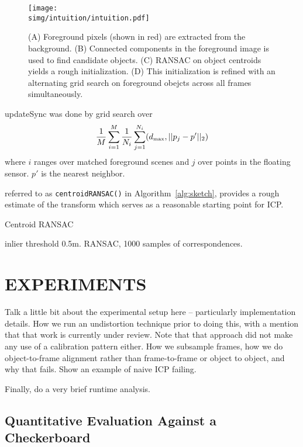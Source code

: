 \documentclass[letterpaper, 10 pt, conference]{ieeeconf}  %
\newcommand{\simg}{static_img}
\begin{document}
\begin{figure*}
  \centering
  \texttt{[image: \\simg/intuition/intuition.pdf]}
  \caption{(A) Foreground pixels (shown in red) are extracted from the background. (B) Connected components in the foreground image is used to find candidate objects. (C) RANSAC on object centroids yields a rough initialization. (D) This initialization is refined with an alternating grid search on foreground obejcts across all frames simultaneously. }
  \label{fig:}
\end{figure*}


updateSync was done by grid search over
\newcommand{\dmax}{d_{\mbox{\tiny{max}}}}
\begin{align*}
  \frac{1}{M} \sum_{i=1}^M \frac{1}{N_i} \sum_{j=1}^{N_i}    (\dmax, ||p_j - p'||_2)
\end{align*}
where $i$ ranges over matched foreground scenes and $j$ over points in the floating sensor.  $p'$ is the nearest neighbor.


referred to as \texttt{centroidRANSAC()} in Algorithm~\ref{alg:sketch}, provides a rough estimate of the transform which serves as a reasonable starting point for ICP.


\begin{algorithm}
  \caption{Centroid RANSAC}
  \label{alg:cal}
  \SetLine
  \phantom{\;}
  inlier threshold 0.5m.  RANSAC, 1000 samples of correspondences.
\end{algorithm}



\section{EXPERIMENTS}

Talk a little bit about the experimental setup here -- particularly implementation details. How we run an undistortion technique 
prior to doing this, with a mention that that work is currently under review. Note that that approach did not make any use of a 
calibration pattern either. How we subsample frames, 
how we do object-to-frame alignment rather than frame-to-frame or object to object, and why that fails. Show an example of naive ICP failing.

Finally, do a very brief runtime analysis.

\subsection{Quantitative Evaluation Against a Checkerboard}
\end{document}
